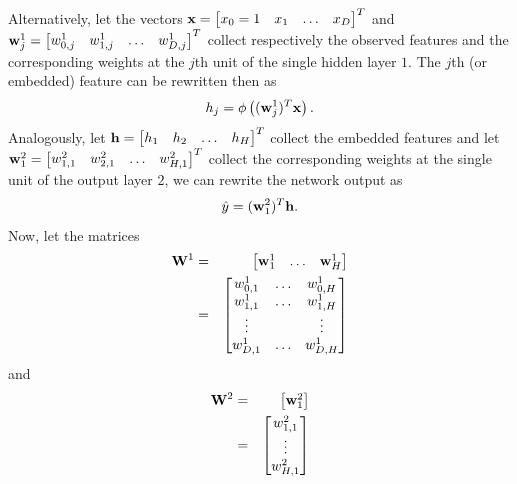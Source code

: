\documentclass[letterpaper,10pt,english]{jupyterBook}
\begin{document}
\sphinxAtStartPar
Alternatively, let the vectors \( {\bf x} = \begin{bmatrix} x_{0} = 1 & x_{1} & \ldots & x_{D} \end{bmatrix}^{T} \) and \( {\bf w}_{j}^{1} = \begin{bmatrix} w^{1}_{0,j} & w^{1}_{1,j} & \ldots & w^{1}_{D,j} \end{bmatrix}^{T} \) collect respectively the observed features and the corresponding weights at the \(j\)\sphinxhyphen{}th unit of the single hidden layer \( 1 \). The \(j\)\sphinxhyphen{}th  (or embedded) feature can be rewritten then as
\label{equation:neuralnets_architecture:fac08fe0-de3a-4131-ae49-1dadeadca67f}\begin{equation}
h_{j} = \phi \left( ({\bf w}_{j}^{1})^{T} {\bf x} \right). \nonumber
\end{equation}
\sphinxAtStartPar
Analogously, let \( {\bf h} = \begin{bmatrix} h_{1} & h_{2} & \ldots & h_{H} \end{bmatrix}^{T} \) collect the embedded features and let \( {\bf w}_{1}^{2} = \begin{bmatrix} w^{2}_{1,1} & w^{2}_{2,1} & \ldots & w^{2}_{H,1} \end{bmatrix}^{T} \) collect the corresponding weights at the single unit of the output layer \( 2 \), we can rewrite the network output as
\label{equation:neuralnets_architecture:fd5fec0e-031f-4ce4-8bc4-60dc469551d0}\begin{equation}
\hat{y} = ({\bf w}_{1}^{2})^{T} {\bf h}. \nonumber
\end{equation}
\sphinxAtStartPar
Now, let the matrices
\label{equation:neuralnets_architecture:09b30da5-339f-4f49-a552-c618a11cf268}\begin{eqnarray}
{\bf W}^{1} &=& \begin{bmatrix} {\bf w}_{1}^{1} & \ldots & {\bf w}_{H}^{1} \end{bmatrix} \nonumber \\
&=& \begin{bmatrix} 
w^{1}_{0,1} & \ldots & w^{1}_{0,H} \\
w^{1}_{1,1} & \ldots & w^{1}_{1,H} \\
\vdots &  & \vdots \\
w^{1}_{D,1} & \ldots & w^{1}_{D,H} \nonumber
\end{bmatrix}
\end{eqnarray}
\sphinxAtStartPar
and
\label{equation:neuralnets_architecture:c3dda1b2-fb3e-49be-b330-46d5e5b81d0d}\begin{eqnarray}
{\bf W}^{2} &=& \begin{bmatrix} {\bf w}_{1}^{2} \end{bmatrix} \nonumber \\
&=& \begin{bmatrix} 
w^{2}_{1,1} \\
\vdots \\
w^{2}_{H,1} \nonumber
\end{bmatrix}
\end{eqnarray}
\end{document}
